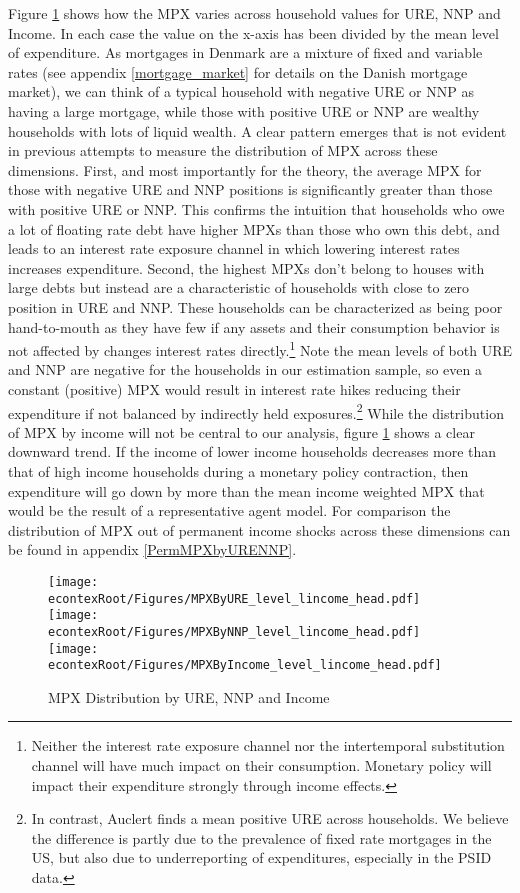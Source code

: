 \documentclass[titlepage]{\econtex}\newcommand{\texname}{ConsumptionHeterogeneity}
\begin{document}
Figure \ref{fig:MPCAuclert} shows how the MPX varies across household values for URE, NNP and Income. In each case the value on the x-axis has been divided by the mean level of expenditure. As mortgages in Denmark are a mixture of fixed and variable rates (see appendix \ref{mortgage_market} for details on the Danish mortgage market), we can think of a typical household with negative URE or NNP as having a large mortgage, while those with positive URE or NNP are wealthy households with lots of liquid wealth. A clear pattern emerges that is not evident in previous attempts to measure the distribution of MPX across these dimensions. First, and most importantly for the theory, the average MPX for those with negative URE and NNP positions is significantly greater than those with positive URE or NNP. This confirms the intuition that households who owe a lot of floating rate debt have higher MPXs than those who own this debt, and leads to an interest rate exposure channel in which lowering interest rates increases expenditure. Second, the highest MPXs don't belong to houses with large debts but instead are a characteristic of households with close to zero position in URE and NNP. These households can be characterized as being poor hand-to-mouth as they have few if any assets and their consumption behavior is not affected by changes interest rates directly.\footnote{Neither the interest rate exposure channel nor the intertemporal substitution channel will have much impact on their consumption. Monetary policy will impact their expenditure strongly through income effects.} Note the mean levels of both URE and NNP are negative for the households in our estimation sample, so even a constant (positive) MPX would result in interest rate hikes reducing their expenditure if not balanced by indirectly held exposures.\footnote{In contrast, Auclert finds a mean positive URE across households. We believe the difference is partly due to the prevalence of fixed rate mortgages in the US, but also due to underreporting of expenditures, especially in the PSID data.} While the distribution of MPX by income will not be central to our analysis, figure \ref{fig:MPCAuclert} shows a clear downward trend. If the income of lower income households decreases more than that of high income households during a monetary policy contraction, then expenditure will go down by more than the mean income weighted MPX that would be the result of a representative agent model. For comparison the distribution of  MPX out of permanent income shocks across these dimensions can be found in appendix \ref{PermMPXbyURENNP}.
\begin{figure} 
\begin{centering}
	\texttt{[image: \\econtexRoot/Figures/MPXByURE\_level\_lincome\_head.pdf]}
	\texttt{[image: \\econtexRoot/Figures/MPXByNNP\_level\_lincome\_head.pdf]}
	\texttt{[image: \\econtexRoot/Figures/MPXByIncome\_level\_lincome\_head.pdf]}
	\caption{MPX Distribution by URE, NNP and Income}
	\label{fig:MPCAuclert}
\end{centering}
\end{figure}
\end{document}
